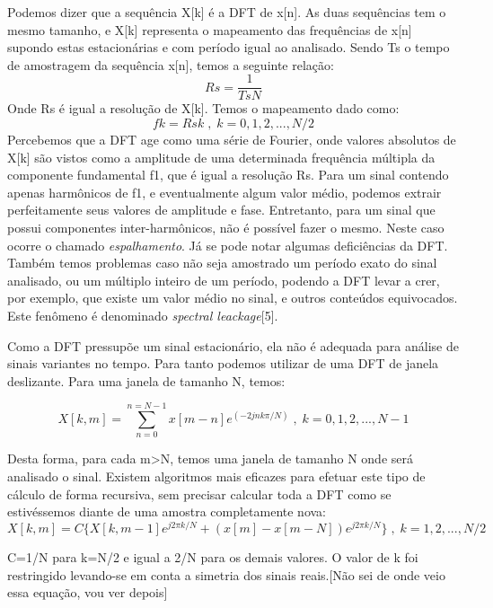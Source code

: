 \documentclass[a4paper, 12pt]{book}
\begin{document}
Podemos dizer que a sequência X[k] é a DFT de x[n]. As duas sequências tem o mesmo tamanho, e X[k] representa o mapeamento das frequências de x[n] supondo estas estacionárias e com período igual ao analisado. Sendo Ts o tempo de amostragem da sequência x[n], temos a seguinte relação:
\begin{equation}
Rs=\frac{1}{TsN}
\end{equation}
\indent Onde Rs é igual a resolução de X[k]. Temos o mapeamento dado como:
\begin{equation}
fk=Rsk\;,\;k=0, 1, 2,...,N/2
\end{equation}
\indent Percebemos que a DFT age como uma série de Fourier, onde valores absolutos de X[k] são vistos como a amplitude de uma determinada frequência múltipla da componente fundamental f1, que é igual a resolução Rs. Para um sinal contendo apenas harmônicos de f1, e eventualmente algum valor médio, podemos extrair perfeitamente seus valores de amplitude e fase. Entretanto, para um sinal que possui componentes inter-harmônicos, não é possível fazer o mesmo. Neste caso ocorre o chamado \textit{espalhamento}. Já se pode notar algumas deficiências da DFT. Também temos problemas caso não seja amostrado um período exato do sinal analisado, ou um múltiplo inteiro de um período, podendo a DFT levar a crer, por exemplo, que existe um valor médio no sinal, e outros conteúdos equivocados. Este fenômeno é denominado \textit{spectral leackage}[5]. 

\indent Como a DFT pressupõe um sinal estacionário, ela não é adequada para análise de sinais variantes no tempo. Para tanto podemos utilizar de uma DFT de janela deslizante. Para uma janela de tamanho N, temos:

\begin{equation}
X[k,m]=\sum_{n=0}^{n=N-1} x[m-n]e^{(-2jnk\pi/N)}\;,\;k=0,1,2,...,N-1
\end{equation}

\indent Desta forma, para cada m>N, temos uma janela de tamanho N onde será analisado o sinal. Existem algoritmos mais eficazes para efetuar este tipo de cálculo de forma recursiva, sem precisar calcular toda a DFT como se estivéssemos diante de uma amostra completamente nova:
\begin{equation}
X[k,m]=C\{X[k,m-1]e^{j2\pi k/N}+(x[m]-x[m-N])e^{j2\pi k/N}\}\;,\;k=1,2,...,N/2
\end{equation}

\indent C=1/N para k=N/2 e igual a 2/N para os demais valores. O valor de k foi restringido levando-se em conta a simetria dos sinais reais.[Não sei de onde veio essa equação, vou ver depois]
\end{document}
